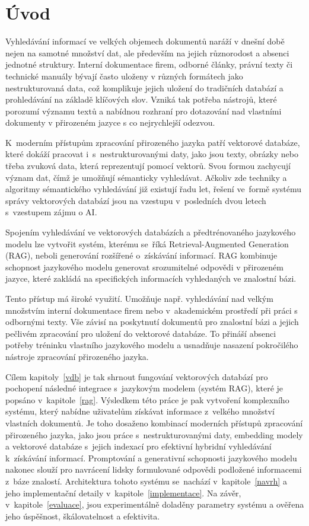 %

\chapter{Úvod}
Vyhledávání informací ve velkých objemech dokumentů naráží v dnešní době nejen na samotné množství dat, ale především na jejich různorodost a absenci jednotné struktury. Interní dokumentace firem, odborné články, právní texty či technické manuály bývají často uloženy v různých formátech jako nestrukturovaná data, což komplikuje jejich uložení do tradičních databází a prohledávání na základě klíčových slov. Vzniká tak potřeba nástrojů, které porozumí významu textů a nabídnou rozhraní pro dotazování nad vlastními dokumenty v přirozeném jazyce s co nejrychlejší odezvou.

K~moderním přístupům zpracování přirozeného jazyka patří vektorové databáze, které dokáží pracovat i~s~nestrukturovanými daty, jako jsou texty, obrázky nebo třeba zvuková data, která reprezentují pomocí vektorů. Svou formou zachycují význam dat, čímž je umožňují sémanticky vyhledávat. Ačkoliv zde techniky a algoritmy sémantického vyhledávání již existují řadu let, řešení ve~formě systému správy vektorových databází jsou na vzestupu v~posledních dvou letech s~vzestupem zájmu o AI. 

Spojením vyhledávání ve vektorových databázích a předtrénovaného jazykového modelu lze vytvořit systém, kterému se~říká Retrieval-Augmented Generation (RAG), neboli generování rozšířené o~získávání informací. RAG kombinuje schopnost jazykového modelu generovat srozumitelné odpovědi v přirozeném jazyce, které zakládá na specifických informacích vyhledaných ve znalostní bázi.

Tento přístup má široké využití. Umožňuje např. vyhledávání nad velkým množstvím interní dokumentace firem nebo v~akademickém prostředí při práci s odbornými texty. Vše závisí na poskytnutí dokumentů pro znalostní bázi a jejich pečlivém zpracování pro uložení do vektorové databáze. To přináší absenci potřeby tréninku vlastního jazykového modelu a usnadňuje nasazení pokročilého nástroje zpracování přirozeného jazyka.

Cílem kapitoly~\ref{vdb} je tak shrnout fungování vektorových databází pro pochopení následné integrace s~jazykovým modelem (systém RAG), které je popsáno v~kapitole~\ref{rag}. Výsledkem této práce je pak vytvoření komplexního systému, který nabídne uživatelům získávat informace z~velkého množství vlastních dokumentů. Je toho dosaženo kombinací moderních přístupů zpracování přirozeného jazyka, jako jsou práce s~nestrukturovanými daty, embedding modely a vektorové databáze s~jejich indexací pro efektivní hybridní vyhledávání k~získávání informací. Promptování a generativní schopnosti jazykového modelu nakonec slouží pro navrácení lidsky formulované odpovědi podložené informacemi z~báze znalostí. Architektura tohoto systému se~nachází v~kapitole~\ref{navrh} a jeho implementační detaily v~kapitole~\ref{implementace}. Na závěr, v~kapitole~\ref{evaluace}, jsou experimentálně doladěny parametry systému a ověřena jeho úspěšnost, škálovatelnost a efektivita.

